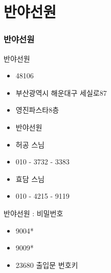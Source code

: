 \documentclass[aspectratio=1610,20pt,xcolor=pdftex,dvipsnames,table,handout]{beamer}
\begin{document}
		\section{반야선원 }
		\begin{frame} [t,plain]
		\frametitle{반야선원 }

			\begin{block} {반야선원}

			\setlength{\leftmargini}{2em}			
			\begin{itemize}
				\item 48106 \hrulefill
				\item 부산광역시 해운대구 세실로87
				\item 영진파스타8층 \hrulefill
				\item 반야선원 \hrulefill
				\item 허공 스님 \hrulefill
				\item 010 - 3732 - 3383 \hrulefill
				\item 효담 스님 \hrulefill
				\item 010 - 4215 - 9119 \hrulefill

			\end{itemize}
			\end{block}						
				

			\begin{block} {반야선원 : 비밀번호 }

			\setlength{\leftmargini}{2em}			
			\begin{itemize}
				\item 9004*
				\item 9009*
				\item 23680 출입문 번호키
			\end{itemize}
			\end{block}						

		\end{frame}						


\end{document}
